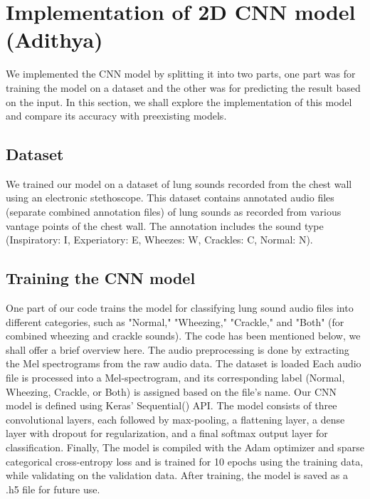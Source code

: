 \documentclass[conference]{IEEEtran}
\begin{document}
\section{Implementation of 2D CNN model (Adithya)}{
We implemented the CNN model by splitting it into two parts, one part was for training the model on a dataset and the other was for predicting the result based on the input. In this section, we shall explore the implementation of this model and compare its accuracy with preexisting models.

\subsection{Dataset}{
We trained our model on a dataset of lung sounds recorded from the chest wall using an electronic stethoscope. This dataset contains annotated audio files (separate combined annotation files) of lung sounds as recorded from various vantage points of the chest wall. The annotation includes the sound type (Inspiratory: I, Experiatory: E, Wheezes: W, Crackles: C, Normal: N).
}
\subsection{Training the CNN model}
One part of our code trains the model for classifying lung sound audio files into different categories, such as "Normal," "Wheezing," "Crackle," and "Both" (for combined wheezing and crackle sounds). The code has been mentioned below, we shall offer a brief overview here. The audio preprocessing is done by extracting the Mel spectrograms from the raw audio data. The dataset is loaded Each audio file is processed into a Mel-spectrogram, and its corresponding label (Normal, Wheezing, Crackle, or Both) is assigned based on the file's name.
Our CNN model is defined using Keras' Sequential() API. The model consists of three convolutional layers, each followed by max-pooling, a flattening layer, a dense layer with dropout for regularization, and a final softmax output layer for classification.
Finally, The model is compiled with the Adam optimizer and sparse categorical cross-entropy loss and is trained for 10 epochs using the training data, while validating on the validation data.
After training, the model is saved as a .h5 file for future use.

}
\end{document}
